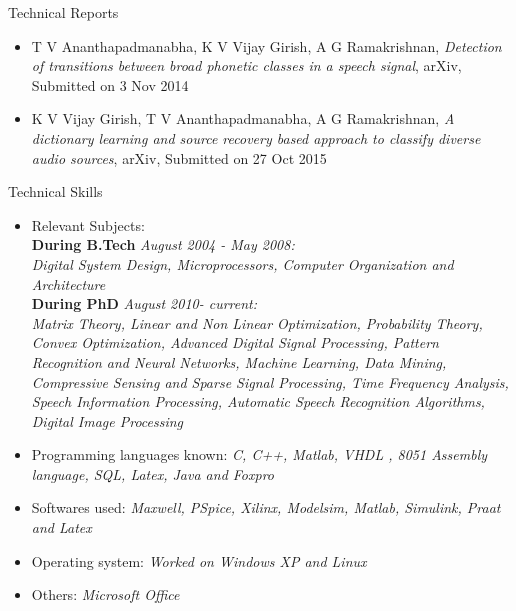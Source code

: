 \documentclass[10pt]{article}
\begin{document}
\begin{cv}
\begin{cvlist}{Technical Reports}
\item
\begin{itemize}
\item T V Ananthapadmanabha, K V Vijay Girish, A G Ramakrishnan, \textit{Detection of transitions between broad phonetic classes in a speech signal}, arXiv, Submitted on 3 Nov 2014
\item K V Vijay Girish, T V Ananthapadmanabha, A G Ramakrishnan, \textit{A dictionary learning and source recovery based approach to classify diverse audio sources}, arXiv, Submitted on 27 Oct 2015
\end{itemize}
\end{cvlist}

\begin{cvlist}{Technical Skills}
\item
\begin{itemize}\itemsep=0.25em
	\item Relevant Subjects:\\
	\textbf{During B.Tech}  \textit{August 2004 - May 2008:}\\
 \textit{Digital System Design,  Microprocessors,
Computer Organization and Architecture}\\
\textbf{During PhD} \textit{August 2010- current:}\\
\textit{Matrix Theory,
Linear and Non Linear Optimization, Probability Theory,  Convex Optimization,
Advanced Digital Signal Processing,
Pattern Recognition and Neural Networks, Machine Learning, Data Mining, Compressive Sensing and Sparse Signal Processing, Time Frequency Analysis, Speech Information Processing, Automatic Speech Recognition Algorithms, Digital Image Processing}



	\item Programming languages known:
 \textit{C, C++, Matlab, VHDL , 8051 Assembly language, SQL, Latex, Java
and Foxpro}

\item Softwares used: \textit{Maxwell, PSpice, Xilinx, Modelsim, Matlab, Simulink, Praat and Latex}
\item Operating system: \textit{Worked on Windows XP and Linux}
\item Others: \textit{Microsoft Office}



	\end{itemize}

\end{cvlist}


\end{cv}
\end{document}
